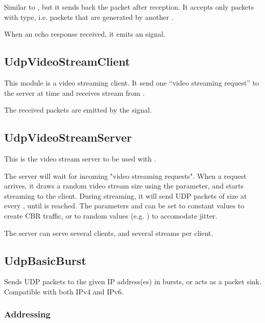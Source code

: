 Similar to , but it sends back the packet after reception.
It accepts only packets with  type, i.e. packets that
are generated by another .

When an echo response received, it emits an  signal.

\subsection{UdpVideoStreamClient}

This module is a video streaming client. It send one ``video streaming request'' to
the server at time  and receives stream from .

The received packets are emitted by the  signal.

\subsection{UdpVideoStreamServer}

This is the video stream server to be used with .

The server will wait for incoming "video streaming requests".
When a request arrives, it draws a random video stream size
using the  parameter, and starts streaming to the client.
During streaming, it will send UDP packets of size  at every
, until  is reached. The parameters 
and  can be set to constant values to create CBR traffic,
or to random values (e.g. ) to
accomodate jitter.

The server can serve several clients, and several streams per client.


\subsection{UdpBasicBurst}

Sends UDP packets to the given IP address(es) in bursts, or acts as a
packet sink. Compatible with both IPv4 and IPv6.

\subsubsection*{Addressing}

